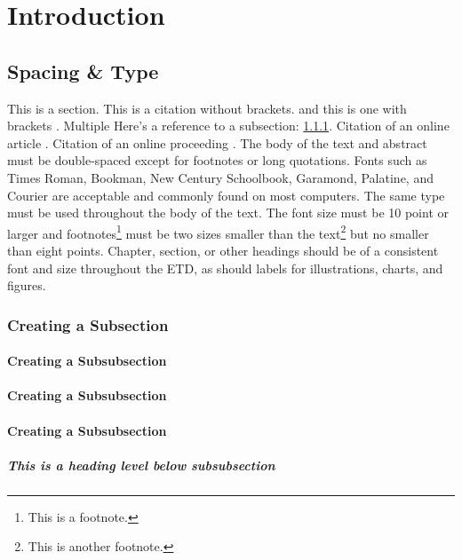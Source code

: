 \chapter{Introduction}
\label{chap:intro}
\section{Spacing \& Type}
\label{sec:section}

This is a section. This is a citation without brackets. and this is one with brackets \cite{A}. Multiple \cite{A,B,C} Here's a reference to a subsection: \ref{sec:subsection}. Citation of an online article \cite{D}. Citation of an online proceeding \cite{F}. The body of the text and abstract must be double-spaced except for footnotes or long quotations. Fonts such as Times Roman, Bookman, New Century Schoolbook, Garamond, Palatine, and Courier are acceptable and commonly found on most computers. The same type must be used throughout the body of the text. The font size must be 10 point or larger and footnotes\footnote{This is a footnote.} must be two sizes smaller than the text\footnote{This is another footnote.} but no smaller than eight points. Chapter, section, or other headings should be of a consistent font and size throughout the ETD, as should labels for illustrations, charts, and figures.

\subsection{Creating a Subsection}
\label{sec:subsection}

\subsubsection{Creating a Subsubsection}
\subsubsection{Creating a Subsubsection}
\subsubsection{Creating a Subsubsection}


\paragraph{This is a heading level below subsubsection}

